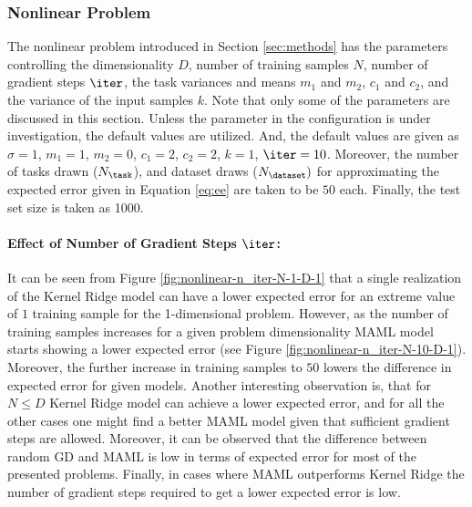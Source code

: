 \subsubsection{Nonlinear Problem}

The nonlinear problem introduced in Section \ref{sec:methods} has the parameters controlling the dimensionality $D$, number of training samples $N$, number of gradient steps $\iter$, the task variances and means $m_1$ and $m_2$, $c_1$ and $c_2$, and the variance of the input samples $k$. Note that only some of the parameters are discussed in this section. Unless the parameter in the configuration is under investigation, the default values are utilized. And, the default values are given as $\sigma=1$, $m_1=1$, $m_2=0$, $c_1=2$, $c_2=2$, $k=1$, $\iter=10$. Moreover, the number of tasks drawn ($N_{\task}$), and dataset draws ($N_{\dataset})$  for approximating the expected error given in Equation \ref{eq:ee} are taken to be $50$ each. Finally, the test set size is taken as 1000.

\paragraph{Effect of Number of Gradient Steps $\iter$:} It can be seen from Figure \ref{fig:nonlinear-n_iter-N-1-D-1} that a single realization of the Kernel Ridge model can have a lower expected error for an extreme value of $1$ training sample for the 1-dimensional problem. However, as the number of training samples increases for a given problem dimensionality MAML model starts showing a lower expected error (see Figure \ref{fig:nonlinear-n_iter-N-10-D-1}). Moreover, the further increase in training samples to $50$ lowers the difference in expected error for given models. Another interesting observation is, that for $N\leq D$ Kernel Ridge model can achieve a lower expected error, and for all the other cases one might find a better MAML model given that sufficient gradient steps are allowed. Moreover, it can be observed that the difference between random GD and MAML is low in terms of expected error for most of the presented problems. Finally, in cases where MAML outperforms Kernel Ridge the number of gradient steps required to get a lower expected error is low.

